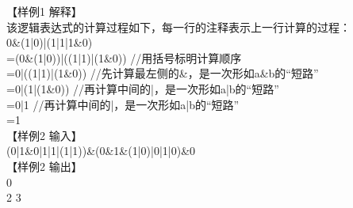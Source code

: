 \documentclass[12pt,twiside,a4paper]{ctexbook}
\numberwithin{chapter}{part}
\begin{document}
【样例1 解释】\\
该逻辑表达式的计算过程如下，每一行的注释表示上一行计算的过程：\\
0\&(1|0)|(1|1|1\&0)\\
=(0\&(1|0))|((1|1)|(1\&0)) //用括号标明计算顺序\\
=0|((1|1)|(1\&0)) //先计算最左侧的\&，是一次形如a\&b的“短路”\\
=0|(1|(1\&0)) //再计算中间的|，是一次形如a|b的“短路”\\
=0|1 //再计算中间的|，是一次形如a|b的“短路”\\
=1\\
【样例2 输入】\\
(0|1\&0|1|1|(1|1))\&(0\&1\&(1|0)|0|1|0)\&0\\
【样例2 输出】\\
0\\
2 3
\end{document}
